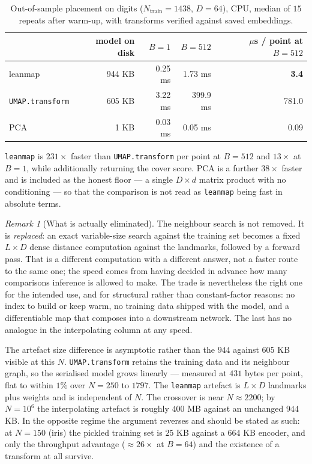 \documentclass[12pt]{iopart}
\theoremstyle{definition}
\theoremstyle{plain}
\theoremstyle{remark}
\newtheorem{remark}{Remark}
\newcommand{\code}[1]{\texttt{#1}}
\begin{document}
\begin{table}[htbp]
\centering
\small
\caption{Out-of-sample placement on digits ($N_{\mathrm{train}}=1438$,
$D=64$), CPU, median of $15$ repeats after warm-up, with transforms verified
against saved embeddings.}
\label{tab:inference}
\begin{tabular}{lrrrr}
\toprule
& model on disk & $B=1$ & $B=512$ & $\mu$s / point at $B=512$ \\
\midrule
leanmap & 944 KB & 0.25 ms & 1.73 ms & \bf 3.4 \\
\code{UMAP.transform} & 605 KB & 3.22 ms & 399.9 ms & 781.0 \\
PCA & 1 KB & 0.03 ms & 0.05 ms & 0.09 \\
\bottomrule
\end{tabular}
\end{table}

\code{leanmap} is $231\times$ faster than \code{UMAP.transform} per point at
$B=512$ and $13\times$ at $B=1$, while additionally returning the cover score.
PCA is a further $38\times$ faster and is included as the honest floor --- a
single $D\times d$ matrix product with no conditioning --- so that the
comparison is not read as \code{leanmap} being fast in absolute terms.

\begin{remark}[What is actually eliminated]
\label{rem:notindexfree}
The neighbour search is not removed. It is \emph{replaced}: an exact
variable-size search against the training set becomes a fixed $L\times D$ dense
distance computation against the landmarks, followed by a forward pass. That is
a different computation with a different answer, not a faster route to the same
one; the speed comes from having decided in advance how many comparisons
inference is allowed to make. The trade is nevertheless the right one for the
intended use, and for structural rather than constant-factor reasons: no index
to build or keep warm, no training data shipped with the model, and a
differentiable map that composes into a downstream network. The last has no
analogue in the interpolating column at any speed.
\end{remark}

The artefact size difference is asymptotic rather than the $944$ against $605$
KB visible at this $N$. \code{UMAP.transform} retains the training data and its
neighbour graph, so the serialised model grows linearly --- measured at $431$
bytes per point, flat to within $1\%$ over $N=250$ to $1797$. The
\code{leanmap} artefact is $L\times D$ landmarks plus weights and is independent
of $N$. The crossover is near $N\approx2200$; by $N=10^6$ the interpolating
artefact is roughly $400$ MB against an unchanged $944$ KB. In the opposite
regime the argument reverses and should be stated as such: at $N=150$ (iris) the
pickled training set is $25$ KB against a $664$ KB encoder, and only the
throughput advantage ($\approx26\times$ at $B=64$) and the existence of a
transform at all survive.
\end{document}
